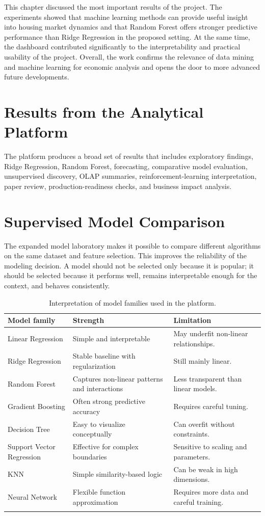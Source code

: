 This chapter discussed the most important results of the project.
The experiments showed that machine learning methods can provide useful insight into housing market dynamics and that Random Forest offers stronger predictive performance than Ridge Regression in the proposed setting.
At the same time, the dashboard contributed significantly to the interpretability and practical usability of the project.
Overall, the work confirms the relevance of data mining and machine learning for economic analysis and opens the door to more advanced future developments.

\section{Results from the Analytical Platform}

The platform produces a broad set of results that includes exploratory findings, Ridge Regression, Random Forest, forecasting, comparative model evaluation, unsupervised discovery, OLAP summaries, reinforcement-learning interpretation, paper review, production-readiness checks, and business impact analysis.

\section{Supervised Model Comparison}

The expanded model laboratory makes it possible to compare different algorithms on the same dataset and feature selection. This improves the reliability of the modeling decision. A model should not be selected only because it is popular; it should be selected because it performs well, remains interpretable enough for the context, and behaves consistently.

\begin{longtable}{p{4cm}p{5cm}p{5cm}}
\toprule
\textbf{Model family} & \textbf{Strength} & \textbf{Limitation} \\
\midrule
Linear Regression & Simple and interpretable & May underfit non-linear relationships. \\
Ridge Regression & Stable baseline with regularization & Still mainly linear. \\
Random Forest & Captures non-linear patterns and interactions & Less transparent than linear models. \\
Gradient Boosting & Often strong predictive accuracy & Requires careful tuning. \\
Decision Tree & Easy to visualize conceptually & Can overfit without constraints. \\
Support Vector Regression & Effective for complex boundaries & Sensitive to scaling and parameters. \\
KNN & Simple similarity-based logic & Can be weak in high dimensions. \\
Neural Network & Flexible function approximation & Requires more data and careful training. \\
\bottomrule
\caption{Interpretation of model families used in the platform.}
\end{longtable}

